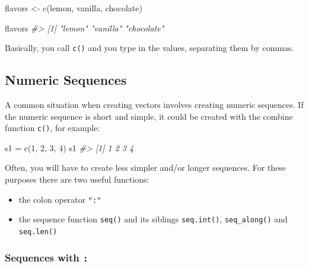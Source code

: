 \documentclass[
]{book}
\newenvironment{Shaded}{\begin{snugshade}}{\end{snugshade}}
\newcommand{\CommentTok}[1]{\textcolor[rgb]{0.56,0.35,0.01}{\textit{#1}}}
\newcommand{\DecValTok}[1]{\textcolor[rgb]{0.00,0.00,0.81}{#1}}
\newcommand{\FunctionTok}[1]{\textcolor[rgb]{0.00,0.00,0.00}{#1}}
\newcommand{\NormalTok}[1]{#1}
\newcommand{\OtherTok}[1]{\textcolor[rgb]{0.56,0.35,0.01}{#1}}
\newcommand{\StringTok}[1]{\textcolor[rgb]{0.31,0.60,0.02}{#1}}
\begin{document}
\begin{Shaded}
\begin{Highlighting}[]
\NormalTok{flavors }\OtherTok{\textless{}{-}} \FunctionTok{c}\NormalTok{(}\StringTok{\textquotesingle{}lemon\textquotesingle{}}\NormalTok{, }\StringTok{\textquotesingle{}vanilla\textquotesingle{}}\NormalTok{, }\StringTok{\textquotesingle{}chocolate\textquotesingle{}}\NormalTok{)}

\NormalTok{flavors}
\CommentTok{\#\textgreater{} [1] "lemon"     "vanilla"   "chocolate"}
\end{Highlighting}
\end{Shaded}

Basically, you call \texttt{c()} and you type in the values, separating them by
commas.

\hypertarget{numeric-sequences}{%
\subsection{Numeric Sequences}\label{numeric-sequences}}

A common situation when creating vectors involves creating numeric sequences.
If the numeric sequence is short and simple, it could be created with the
combine function \texttt{c()}, for example:

\begin{Shaded}
\begin{Highlighting}[]
\NormalTok{s1 }\OtherTok{=} \FunctionTok{c}\NormalTok{(}\DecValTok{1}\NormalTok{, }\DecValTok{2}\NormalTok{, }\DecValTok{3}\NormalTok{, }\DecValTok{4}\NormalTok{)}
\NormalTok{s1}
\CommentTok{\#\textgreater{} [1] 1 2 3 4}
\end{Highlighting}
\end{Shaded}

Often, you will have to create less simpler and/or longer sequences. For these
purposes there are two useful functions:

\begin{itemize}
\item
  the colon operator \texttt{":"}
\item
  the sequence function \texttt{seq()} and its siblings \texttt{seq.int()}, \texttt{seq\_along()}
  and \texttt{seq.len()}
\end{itemize}

\hypertarget{sequences-with}{%
\subsubsection*{\texorpdfstring{Sequences with \texttt{:}}{Sequences with :}}\label{sequences-with}}
\end{document}
